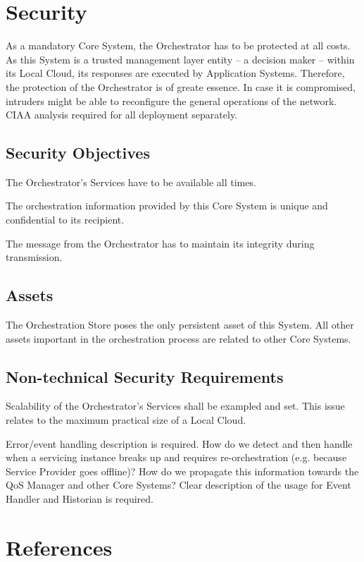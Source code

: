 \documentclass[a4paper]{arrowhead}
\begin{document}
\section{Security }
As a mandatory Core System, the Orchestrator has to be protected at all costs. As this System is a trusted management layer entity -- a decision maker -- within its Local Cloud, its responses are executed by Application Systems. Therefore, the protection of the Orchestrator is of greate essence. In case it is compromised, intruders might be able to reconfigure the general operations of the network. CIAA analysis required for all deployment separately. 

\subsection{Security Objectives}
The Orchestrator's Services have to be available all times.

 The orchestration information provided by this Core System is unique and confidential to its recipient. 
 
 The message from the Orchestrator has to maintain its integrity during transmission. 

\subsection{Assets}
The Orchestration Store poses the only persistent asset of this System. All other assets important in the orchestration process are related to other Core Systems.

\subsection[Non{}-technical Security Requirements]{Non-technical Security Requirements}
 
Scalability of the Orchestrator's Services shall be exampled and set. This issue relates to the maximum practical size of a Local Cloud. 

Error/event handling description is required. How do we detect and then handle when a servicing instance breaks up and requires re-orchestration (e.g. because Service Provider goes offline)? How do we propagate this information towards the QoS Manager and other Core Systems? Clear description of the usage for Event Handler and Historian is required. 

\pagebreak
\section[References]{References}
\end{document}

